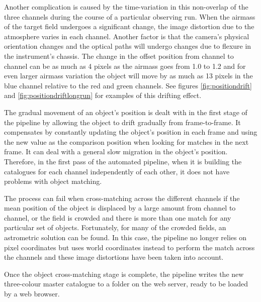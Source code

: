 Another complication is caused by the time-variation in this non-overlap of the three channels during the course of a particular observing run. When the airmass of the target field undergoes a significant change, the image distortion due to the atmosphere varies in each channel. Another factor is that the camera's physical orientation changes and the optical paths will undergo changes due to flexure in the instrument's chassis. The change in the offset position from channel to channel can be as much as 4 pixels as the airmass goes from 1.0 to 1.2 and for even larger airmass variation the object will move by as much as 13 pixels in the blue channel relative to the red and green channels. See figures \ref{fig:positiondrift} and \ref{fig:positiondriftlongrun} for examples of this drifting effect. 

The gradual movement of an object's position is dealt with in the first stage of the pipeline by allowing the object to drift gradually from frame-to-frame. It compensates by constantly updating the object's position in each frame and using the new value as the comparison position when looking for matches in the next frame. It can deal with a general slow migration in the object's position. Therefore, in the first pass of the automated pipeline, when it is building the catalogues for each channel independently of each other, it does not have problems with object matching. 

The process can fail when cross-matching across the different channels if the mean position of the object is displaced by a large amount from channel to channel, or the field is crowded and there is more than one match for any particular set of objects. Fortunately, for many of the crowded fields, an astrometric solution can be found. In this case, the pipeline  no longer relies on pixel coordinates but uses world coordinates instead to perform the match across the channels and these image distortions have been taken into account. 

Once the object cross-matching stage is complete, the pipeline writes the new three-colour master catalogue to a folder on the web server, ready to be loaded by a web browser. 



